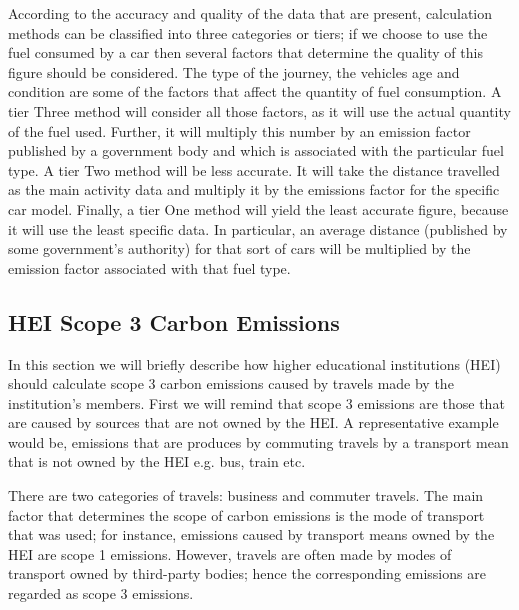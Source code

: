 According to the accuracy and quality of the data that are present, calculation methods can be classified into three categories or tiers; if we choose to use the fuel consumed by a car then several factors that determine the quality of this figure should be considered. The type of the journey, the vehicles age and condition are some of the factors that affect the quantity of fuel consumption. A tier Three method will consider all those factors, as it will use the actual quantity of the fuel used. Further, it will multiply this number by an emission factor published by a government body and which is associated with the particular fuel type. A tier Two method will be less accurate. It will take the distance travelled as the main activity data and multiply it by the emissions factor for the specific car model. Finally, a tier One method will yield the least accurate figure, because it will use the least specific data. In particular, an average distance (published by some government's authority) for that sort of cars will be multiplied by the emission factor associated with that fuel type.

\subsection{HEI Scope 3 Carbon Emissions}

In this section we will briefly describe how higher educational institutions (HEI) should calculate scope 3 carbon emissions caused by travels made by the institution's members\cite{reference24}. First we will remind that scope 3 emissions are those that are caused by sources that are not owned by the HEI. A representative example would be, emissions that are produces by commuting travels by a transport mean that is not owned by the HEI e.g. bus, train etc.

There are two categories of travels: business and commuter travels. The main factor that determines the scope of carbon emissions is the mode of transport that was used; for instance, emissions caused by transport means owned by the HEI are scope 1 emissions. However, travels are often made by modes of transport owned by third-party bodies; hence the corresponding emissions are regarded as scope 3 emissions.

